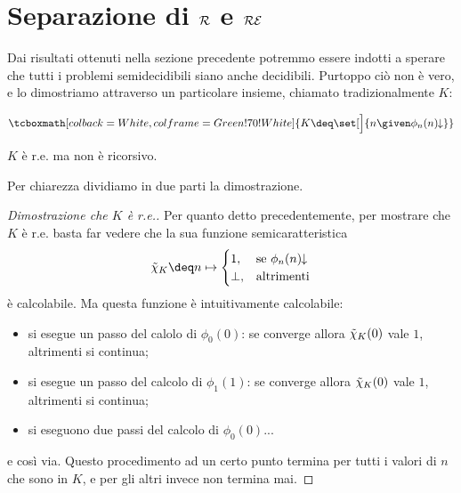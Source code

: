 \section{Separazione di \texorpdfstring{$\mathcal{R}$ e $\mathcal{RE}$}{R e RE}}

Dai risultati ottenuti nella sezione precedente potremmo essere indotti a sperare che tutti i problemi semidecidibili siano anche decidibili. Purtoppo ciò non è vero, e lo dimostriamo attraverso un particolare insieme, chiamato tradizionalmente $K$:

\begin{equation}
    \tcboxmath[colback=White, colframe=Green!70!White]{K \deq \set[\Big]{n \given \phi_n(n)\conv}}
\end{equation}

\begin{theorem}
    {}{}
    $K$ è r.e. ma non è ricorsivo.
\end{theorem}

Per chiarezza dividiamo in due parti la dimostrazione.

\begin{proof}[Dimostrazione che $K$ è r.e.]
    Per quanto detto precedentemente, per mostrare che $K$ è r.e. basta far vedere che la sua funzione semicaratteristica \[
        \scharf{K} \deq n \mapsto \begin{cases}
            1, &\text{se } \phi_n(n)\conv \\
            \bot, &\text{altrimenti}
        \end{cases}
    \] è calcolabile. Ma questa funzione è intuitivamente calcolabile: \begin{itemize}
        \item si esegue un passo del calolo di $\phi_0(0)$: se converge allora $\tilde{\chi}_{K}(0)$ vale $1$, altrimenti si continua;
        \item si esegue un passo del calcolo di $\phi_1(1)$: se converge allora $\tilde{\chi}_{K}(0)$ vale $1$, altrimenti si continua;
        \item si eseguono due passi del calcolo di $\phi_0(0)$...       
    \end{itemize} e così via. Questo procedimento ad un certo punto termina per tutti i valori di $n$ che sono in $K$, e per gli altri invece non termina mai.
\end{proof}

